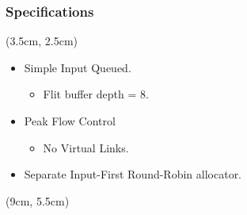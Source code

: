 \documentclass{beamer}
\begin{document}
	    \begin{frame}\frametitle{Specifications}
	    \begin{textblock*}{3.5cm}(3.5cm, 2.5cm) %

	    \end{textblock*}
	    \pause
	    \pause
	    \begin{itemize}
	        \item Simple Input Queued.
	        \pause
	        \begin{itemize}
	            \item Flit buffer depth = 8.
	        \end{itemize}
	        \pause
	        \item Peak Flow Control
	        \pause
	        \begin{itemize}
	            \item No Virtual Links.
	        \end{itemize}
	        \pause
	        \item Separate Input-First Round-Robin allocator.
	    \end{itemize}
	    \begin{textblock*}{3cm}(9cm, 5.5cm) %

        \end{textblock*}
	    \end{frame}
	    
\end{document}
